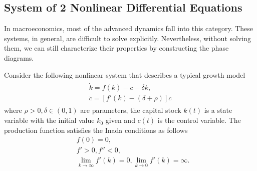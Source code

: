 \documentclass[11pt,a4paper]{book}
\theoremstyle{definition}\newtheorem{definition}{Definition}
\theoremstyle{definition}\newtheorem{fact}{Fact}
\theoremstyle{definition}\newtheorem{remark}{Remark}
\theoremstyle{definition}\newtheorem{ex}{Ex.}
\theoremstyle{definition}\newtheorem{project}{Project}
\theoremstyle{definition}\newtheorem{problem}{Problem}
\theoremstyle{definition}\newtheorem{example}{Example}
\numberwithin{theorem}{section}
\numberwithin{corollary}{chapter}
\numberwithin{assumption}{chapter}
\numberwithin{definition}{chapter}
\numberwithin{prop}{chapter}
\numberwithin{notation}{chapter}
\numberwithin{problem}{chapter}
\numberwithin{example}{chapter}
\numberwithin{fact}{chapter}
\numberwithin{ex}{chapter}
\begin{document}
	\subsection{System of 2 Nonlinear Differential Equations}
	In macroeconomics, most of the advanced dynamics fall into this category. These systems, in general, are difficult to solve explicitly. Nevertheless, without solving them, we can still characterize their properties by constructing the phase diagrams.  
	
	Consider the following nonlinear system that describes a typical growth model
	\begin{align}
		\begin{matrix}
			\dot{k} = f (k) - c - \delta k, \\
			\dot{c} = [ f'(k) - (\delta + \rho) ] c
		\end{matrix} \label{eq:sys_nonlin}
	\end{align}
	where $\rho > 0, \delta \in (0,1)$ are parameters, the capital stock $k(t)$ is a state variable with the initial value $k_0$ given and $c(t)$ is the control variable. The production function satisfies the Inada conditions as follows
	\begin{align*}
		&f(0) = 0, \\
		&f' > 0, f'' < 0, \\
		&\lim_{k\to\infty}  f'(k) = 0, \lim_{k\to 0} f'(k) = \infty.
	\end{align*}
	
\end{document}
